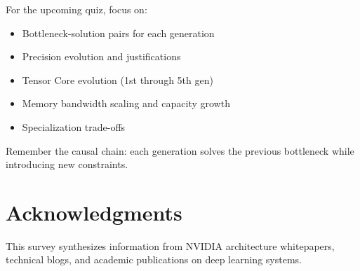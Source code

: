 \documentclass{article}
\begin{document}
For the upcoming quiz, focus on:
\begin{itemize}
\item Bottleneck-solution pairs for each generation
\item Precision evolution and justifications
\item Tensor Core evolution (1st through 5th gen)
\item Memory bandwidth scaling and capacity growth
\item Specialization trade-offs
\end{itemize}

Remember the causal chain: each generation solves the previous bottleneck while introducing new constraints.

\section*{Acknowledgments}

This survey synthesizes information from NVIDIA architecture whitepapers, technical blogs, and academic publications on deep learning systems.



\end{document}
